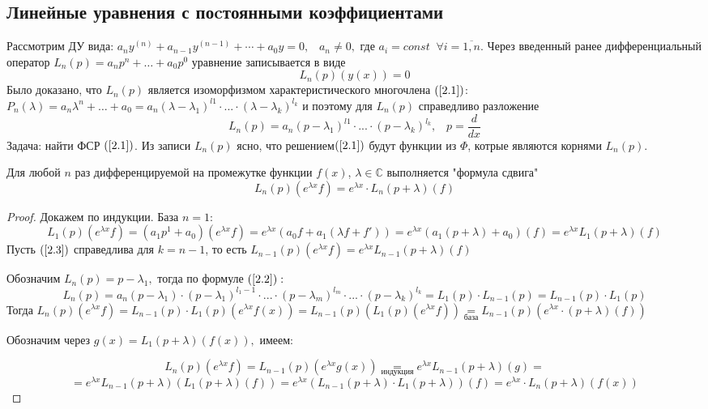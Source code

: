 \subsection{Линейные уравнения с поcтоянными коэффициентами}
Рассмотрим ДУ вида: $a_n y^{(n)}+a_{n-1}y^{(n-1)} + \cdots +a_0y=0, \;\;\;a_n \neq 0, $ где $a_i=const\;\;\forall i=\overline{1, n}.$ Через введенный ранее дифференциальный оператор $L_n(p)=a_np^n+ \dots + a_0 p^0$ уравнение записывается в виде \begin{equation}\tag{2.1}
\label{2.1}
    L_n(p)(y(x))=0
\end{equation}
Было доказано, что $L_n(p)$ является изоморфизмом характеристического многочлена $(\ref{2.1})$: $P_n(\lambda)=a_n\lambda^n+\dots+a_0=a_n(\lambda-\lambda_1)^{l1}\cdot ... \cdot (\lambda-\lambda_{k})^{l_k}$ и поэтому для $L_n(p)$ справедливо разложение \begin{equation}
    \tag{2.2}
    \label{2.2}
    L_n(p)=a_n(p-\lambda_1)^{l1}\cdot ... \cdot (p-\lambda_{k})^{l_k}, \;\;\;p=\frac{d}{dx}
\end{equation}
Задача: найти ФСР $(\ref{2.1})$. Из записи $L_n(p)$ ясно, что решением$ (\ref{2.1})$ будут функции из $\varPhi$, котрые являются корнями $L_n(p)$.
\begin{lemma}
Для любой $n$ раз дифференцируемой на промежутке функции $f(x)$, $\lambda\in\mathds{C}$ выполняется "формула сдвига" \begin{equation}
    \tag{2.3}
    \label{2.3}
    L_n(p)(e^{\lambda x}f)=e^{\lambda x}\cdot L_n(p+\lambda)(f)
\end{equation}  
\end{lemma}
\begin{proof}
Докажем по индукции. База $n=1$: $$L_1(p)(e^{\lambda x}f)=(a_1p^1+a_0)(e^{\lambda x}f)=e^{\lambda x}(a_0f+a_1(\lambda f+ f'))=e^{\lambda x}(a_1(p+\lambda)+a_0)(f)=e^{\lambda x}L_1(p+\lambda)(f)$$
Пусть $(\ref{2.3})$ справедлива для $k=n-1$, то есть $L_{n-1}(p)(e^{\lambda x} f)=e^{\lambda x} L_{n-1}(p+\lambda)(f)$\par
Обозначим $L_n(p)=p-\lambda_1,$ тогда по формуле $(\ref{2.2}):$
$$L_n(p)=a_n(p-\lambda_1)\cdot (p-\lambda_1)^{l_1-1}\cdot ...\cdot (p-\lambda_m)^{l_m} \cdot ... \cdot (p-\lambda_k)^{l_k}=L_1(p)\cdot L_{n-1}(p)=L_{n-1}(p)\cdot L_1(p)$$
Тогда $L_n(p)(e^{\lambda x }f) = L_{n-1}(p) \cdot L_1(p)(e^{\lambda x}f(x))=L_{n-1}(p)(L_1(p)(e^{\lambda x}f))\underset{\text{база}}{=} L_{n-1}(p)(e^{\lambda x}\cdot (p+\lambda) (f))$\par
Обозначим через $g(x)=L_1(p+\lambda)(f(x)),$ имеем:

$$L_n(p)(e^{\lambda x}f) = L_{n-1}(p)(e^{\lambda x}g(x))\underset{\text{индукция}}{=}e^{\lambda x}L_{n-1}(p+\lambda)(g) = $$ $$ = e^{\lambda x}L_{n-1}(p+\lambda)(L_1(p+\lambda)(f))=e^{\lambda x}(L_{n-1}(p+\lambda)\cdot L_{1}(p+\lambda))(f)=e^{\lambda x}\cdot L_n(p+\lambda)(f(x))$$

\end{proof}
